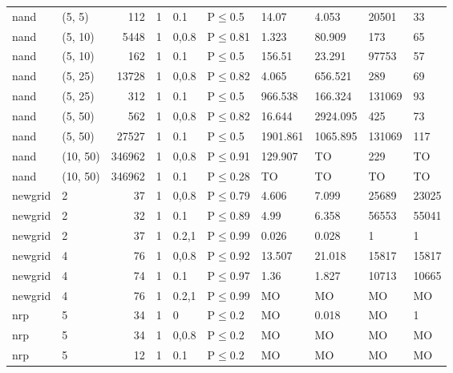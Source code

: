 \begin{longtable}{llrrllllll}
 nand          & (5, 5)   &    	112 & 1 & 0.1   & P$\leq$0.5   & 14.07    & 4.053    & 20501   & 33     \\
 nand          & (5, 10)  &   	5448 & 1 & 0,0.8 & P$\leq$0.81  & 1.323    & 80.909   & 173     & 65     \\
 nand          & (5, 10)  &    	162 & 1 & 0.1   & P$\leq$0.5   & 156.51   & 23.291   & 97753   & 57     \\
 nand          & (5, 25)  &  	13728 & 1 & 0,0.8 & P$\leq$0.82  & 4.065    & 656.521  & 289     & 69     \\
 nand          & (5, 25)  &    	312 & 1 & 0.1   & P$\leq$0.5   & 966.538  & 166.324  & 131069  & 93     \\
 nand          & (5, 50)  &    	562 & 1 & 0,0.8 & P$\leq$0.82  & 16.644   & 2924.095 & 425     & 73     \\
 nand          & (5, 50)  &  	27527 & 1 & 0.1   & P$\leq$0.5   & 1901.861 & 1065.895 & 131069  & 117    \\
 nand          & (10, 50) & 	346962 & 1 & 0,0.8 & P$\leq$0.91  & 129.907  & TO       & 229     & TO     \\
 nand          & (10, 50) & 	346962 & 1 & 0.1   & P$\leq$0.28  & TO       & TO       & TO      & TO     \\
 newgrid       & 2        &     	37 & 1 & 0,0.8 & P$\leq$0.79  & 4.606    & 7.099    & 25689   & 23025  \\
 newgrid       & 2        &     	32 & 1 & 0.1   & P$\leq$0.89  & 4.99     & 6.358    & 56553   & 55041  \\
 newgrid       & 2        &     	37 & 1 & 0.2,1 & P$\leq$0.99  & 0.026    & 0.028    & 1       & 1      \\
 newgrid       & 4        &     	76 & 1 & 0,0.8 & P$\leq$0.92  & 13.507   & 21.018   & 15817   & 15817  \\
 newgrid       & 4        &     	74 & 1 & 0.1   & P$\leq$0.97  & 1.36     & 1.827    & 10713   & 10665  \\
 newgrid       & 4        &     	76 & 1 & 0.2,1 & P$\leq$0.99  & MO       & MO       & MO      & MO     \\
 nrp           & 5        &     	34 & 1 & 0     & P$\leq$0.2   & MO       & 0.018    & MO      & 1      \\
 nrp           & 5        &     	34 & 1 & 0,0.8 & P$\leq$0.2   & MO       & MO       & MO      & MO     \\
 nrp           & 5        &     	12 & 1 & 0.1   & P$\leq$0.2   & MO       & MO       & MO      & MO     \\

\end{longtable}
